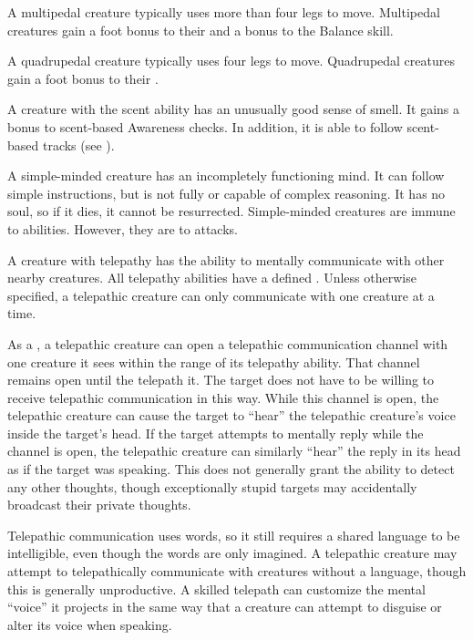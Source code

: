   A multipedal creature typically uses more than four legs to move.
  Multipedal creatures gain a  foot bonus to their  and a  bonus to the Balance skill.

  A quadrupedal creature typically uses four legs to move.
  Quadrupedal creatures gain a  foot bonus to their .

  A creature with the scent ability has an unusually good sense of smell.
  It gains a  bonus to scent-based Awareness checks.
  In addition, it is able to follow scent-based tracks (see ).

  A simple-minded creature has an incompletely functioning mind.
  It can follow simple instructions, but is not fully  or capable of complex reasoning.
  It has no soul, so if it dies, it cannot be resurrected.
  Simple-minded creatures are immune to  abilities.
  However, they are \vulnerable to  attacks.

  A creature with telepathy has the ability to mentally communicate with other nearby creatures.
  All telepathy abilities have a defined .
  Unless otherwise specified, a telepathic creature can only communicate with one creature at a time.

  As a , a telepathic creature can open a telepathic communication channel with one creature it sees within the range of its telepathy ability.
  That channel remains open until the telepath  it.
  The target does not have to be willing to receive telepathic communication in this way.
  While this channel is open, the telepathic creature can cause the target to ``hear'' the telepathic creature's voice inside the target's head.
  If the target attempts to mentally reply while the channel is open, the telepathic creature can similarly ``hear'' the reply in its head as if the target was speaking.
  This does not generally grant the ability to detect any other thoughts, though exceptionally stupid targets may accidentally broadcast their private thoughts.

  Telepathic communication uses words, so it still requires a shared language to be intelligible, even though the words are only imagined.
  A telepathic creature may attempt to telepathically communicate with creatures without a language, though this is generally unproductive.
  A skilled telepath can customize the mental ``voice'' it projects in the same way that a creature can attempt to disguise or alter its voice when speaking.


